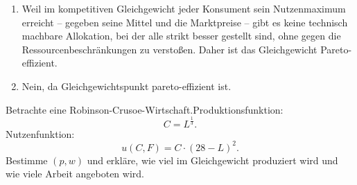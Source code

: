 \begin{solution}
	\begin{enumerate}
		\item Weil im kompetitiven Gleichgewicht jeder Konsument sein Nutzenmaximum erreicht – gegeben seine Mittel und die Marktpreise – gibt es keine technisch machbare Allokation, bei der alle strikt besser gestellt sind, ohne gegen die Ressourcenbeschränkungen zu verstoßen.
		      Daher ist das Gleichgewicht Pareto-effizient.
		\item Nein, da Gleichgewichtspunkt pareto-effizient ist.
	\end{enumerate}
\end{solution}


\begin{question}
	Betrachte eine Robinson-Crusoe-Wirtschaft.Produktionsfunktion:
	\[
		C=L^{\frac{1}{3}}
		.\]
	Nutzenfunktion:
	\[
		u(C,F) = C \cdot (28-L)^2
		.\]
	Bestimme $(p,w)$ und erkläre, wie viel im Gleichgewicht produziert wird und wie viele Arbeit angeboten wird.
\end{question}

